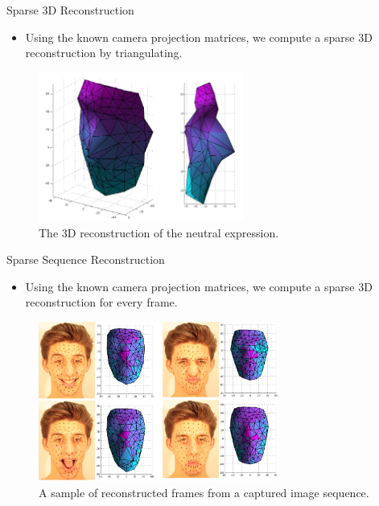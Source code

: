 \documentclass{beamer}
\begin{document}
\begin{frame}{Sparse 3D Reconstruction}

\begin{itemize}
\setlength\itemsep{0.5em}
\item Using the known camera projection matrices, we compute a sparse 3D reconstruction by triangulating.
\end{itemize}

\begin{center}
\begin{figure}
\includegraphics[width=0.6\textwidth]{img/face}
\caption{\tiny{The 3D reconstruction of the neutral expression.}}
\end{figure}
\end{center}

\end{frame}



\begin{frame}{Sparse Sequence Reconstruction}

\begin{itemize}
\setlength\itemsep{0.5em}
\item Using the known camera projection matrices, we compute a sparse 3D reconstruction for every frame.
\end{itemize}

\begin{center}
\begin{figure}
\includegraphics[width=0.7\textwidth]{img/faces}
\caption{\tiny{A sample of reconstructed frames from a captured image sequence.}}
\end{figure}
\end{center}

\end{frame}
\end{document}
